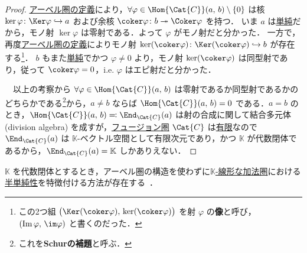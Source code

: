 \documentclass[TQFT_main]{subfiles}
\begin{document}
\begin{proof}
    \hyperref[def:additive-cat]{アーベル圏の定義}により，$\forall \varphi \in \Hom{\Cat{C}}(a,\, b) \setminus \{0\}$ は核 $\ker \varphi \colon \Ker \varphi \hookrightarrow a$ および余核 $\coker \varphi \colon b \twoheadrightarrow \Coker \varphi$ を持つ．
        いま $a$ は\hyperref[def:semisimple-cat]{単純}だから，モノ射 $\ker \varphi$ は零射である．よって $\varphi$ がモノ射だと分かった．
        一方で，再度\hyperref[def:additive-cat]{アーベル圏の定義}によりモノ射 $\ker (\coker \varphi) \colon \Ker (\coker \varphi) \hookrightarrow b$ が存在する\footnote{この2つ組 $\bigl(\Ker (\coker \varphi),\, \ker (\coker \varphi)\bigr)$ を射 $\varphi$ の\textbf{像}と呼び，$(\Im \varphi,\, \im \varphi)$ と書くのだった．}．
        $b$ もまた\hyperref[def:semisimple-cat]{単純}でかつ $\varphi \neq 0$ より，モノ射 $\ker (\coker \varphi)$ は同型射であり，従って $\coker \varphi = 0$，i.e. $\varphi$ はエピ射だと分かった．

        　以上の考察から $\forall \varphi \in \Hom{\Cat{C}}(a,\, b)$ は零射であるか同型射であるかのどちらかである\footnote{これを\textbf{Schurの補題}と呼ぶ．}から，$a \neq b$ ならば $\Hom{\Cat{C}}(a,\, b) = 0$ である．$a = b$ のとき，$\Hom{\Cat{C}}(a,\, b) \eqqcolon \End_{\Cat{C}}(a)$ は射の合成に関して結合多元体 (division algebra) を成すが，\hyperref[def:tensorfusion-cat]{フュージョン圏} $\Cat{C}$ は\hyperref[def:finite-abcat]{有限}なので $\End_{\Cat{C}}(a)$ は $\mathbb{K}$-ベクトル空間として有限次元であり，かつ $\mathbb{K}$ が代数閉体であるから，$\End_{\Cat{C}}(a) = \mathbb{K}$ しかありえない．
\end{proof}

$\mathbb{K}$ を代数閉体とするとき，アーベル圏の構造を使わずに\hyperref[def:additive-cat]{$\mathbb{K}$-線形な加法圏}における\hyperref[def:semisimple]{半単純性}を特徴付ける方法が存在する~\cite[p.6]{Mueger2002subfactor}．
\end{document}
